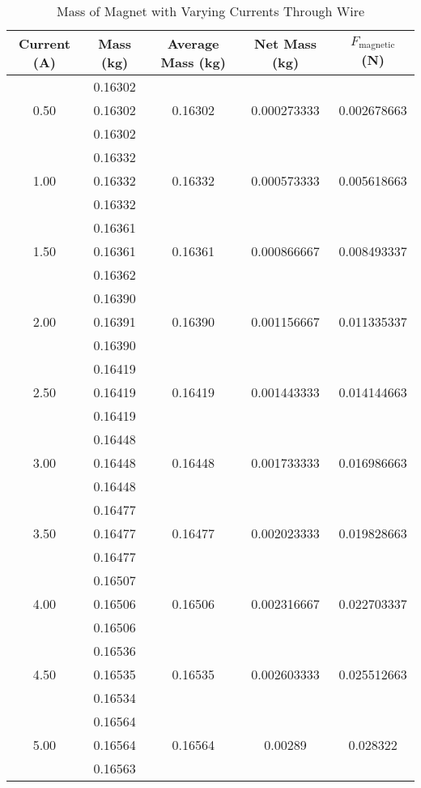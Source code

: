 \documentclass [12pt, letterpaper, twoside] {article}
\begin{document}
\begin{table}
  \centering
  \begin{tabular}{| c | c | c | c | c |}
    \hline\hline
    Current (A) & Mass (kg) & Average Mass (kg) & Net Mass (kg) & \(F_{\text{magnetic}}\) (N) \\
    \hline
    \multirow{3}{*}{0.50} & 0.16302 & & & \\
    & 0.16302 & 0.16302 & 0.000273333 & 0.002678663 \\
    & 0.16302 & & & \\
    \hline
    \multirow{3}{*}{1.00} & 0.16332 & & & \\
    & 0.16332 & 0.16332 & 0.000573333 & 0.005618663 \\
    & 0.16332 & & & \\
    \hline
    \multirow{3}{*}{1.50} & 0.16361 & & & \\
    & 0.16361 & 0.16361 & 0.000866667 & 0.008493337 \\
    & 0.16362 & & & \\
    \hline
    \multirow{3}{*}{2.00} & 0.16390 & & & \\
    & 0.16391 & 0.16390 & 0.001156667 & 0.011335337 \\
    & 0.16390 & & & \\
    \hline
    \multirow{3}{*}{2.50} & 0.16419 & & & \\
    & 0.16419 & 0.16419 & 0.001443333 & 0.014144663 \\
    & 0.16419 & & & \\
    \hline
    \multirow{3}{*}{3.00} & 0.16448 & & & \\
    & 0.16448 & 0.16448 & 0.001733333 & 0.016986663 \\
    & 0.16448 & & & \\
    \hline
    \multirow{3}{*}{3.50} & 0.16477 & & & \\
    & 0.16477 & 0.16477 & 0.002023333 & 0.019828663 \\
    & 0.16477 & & & \\
    \hline
    \multirow{3}{*}{4.00} & 0.16507 & & & \\
    & 0.16506 & 0.16506 & 0.002316667 & 0.022703337 \\
    & 0.16506 & & & \\
    \hline
    \multirow{3}{*}{4.50} & 0.16536 & & & \\
    & 0.16535 & 0.16535 & 0.002603333 & 0.025512663 \\
    & 0.16534 & & & \\
    \hline
    \multirow{3}{*}{5.00} & 0.16564 & & & \\
    & 0.16564 & 0.16564 & 0.00289 & 0.028322 \\
    & 0.16563 & & & \\
    \hline\hline
  \end{tabular}
  \caption{Mass of Magnet with Varying Currents Through Wire}
  \label{fig:tab1}
\end{table}
\end{document}
